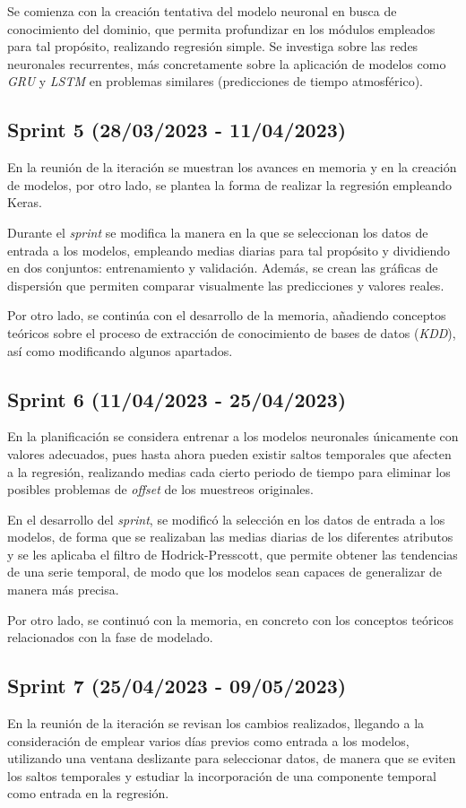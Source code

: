 Se comienza con la creación tentativa del modelo neuronal en busca de conocimiento del dominio, que permita profundizar en los módulos empleados para tal
propósito, realizando regresión simple.
Se investiga sobre las redes neuronales recurrentes, más concretamente sobre la aplicación de modelos como \textit{GRU} y \textit{LSTM} en problemas
similares (predicciones de tiempo atmosférico).

\subsection{Sprint 5 (28/03/2023 - 11/04/2023)}
En la reunión de la iteración se muestran los avances en memoria y en la creación de modelos, por otro lado, se plantea la forma de realizar la regresión
empleando Keras.

Durante el \textit{sprint} se modifica la manera en la que se seleccionan los datos de entrada a los modelos, empleando medias diarias para tal propósito y 
dividiendo en dos conjuntos: entrenamiento y validación. Además, se crean las gráficas de dispersión que permiten comparar visualmente
las predicciones y valores reales.

Por otro lado, se continúa con el desarrollo de la memoria, añadiendo conceptos teóricos sobre el proceso de extracción de conocimiento de bases de datos 
(\textit{KDD}), así como modificando algunos apartados.

\subsection{Sprint 6 (11/04/2023 - 25/04/2023)}
En la planificación se considera entrenar a los modelos neuronales únicamente con valores adecuados, pues hasta ahora pueden existir saltos temporales que
afecten a la regresión, realizando medias cada cierto periodo de tiempo para eliminar los posibles problemas de \textit{offset} de los 
muestreos originales.

En el desarrollo del \textit{sprint}, se modificó la selección en los datos de entrada a los modelos, de forma que se realizaban las medias diarias de los
diferentes atributos y se les aplicaba el filtro de Hodrick-Presscott, que permite obtener las tendencias de una serie temporal,
de modo que los modelos sean capaces de generalizar de manera más precisa.

Por otro lado, se continuó con la memoria, en concreto con los conceptos teóricos relacionados con la fase de modelado.

\subsection{Sprint 7 (25/04/2023 - 09/05/2023)}
En la reunión de la iteración se revisan los cambios realizados, llegando a la consideración de emplear varios días previos como entrada a los modelos,
utilizando una ventana deslizante para seleccionar datos, de manera que se eviten los saltos temporales y estudiar la incorporación de una componente temporal 
como entrada en la regresión.

